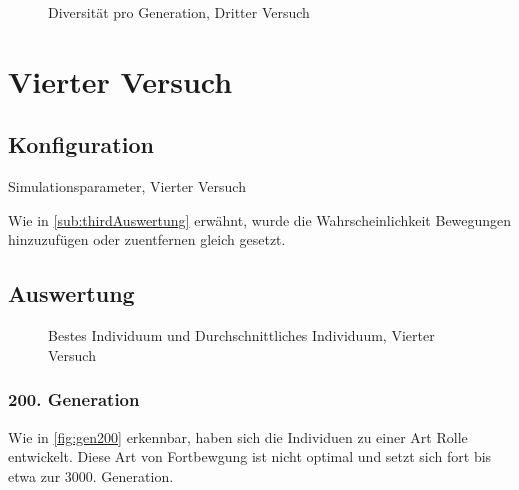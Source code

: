           \begin{figure}
            \centering
            
            \caption{Diversität pro Generation, Dritter Versuch\label{fig:graphDivThird}}
          \end{figure}

      \section{Vierter Versuch}

        \subsection{Konfiguration}

          \begin{table}[H]
            \centering
            
            \caption{Simulationsparameter, Vierter Versuch \label{tbl:forthRunConf}}
          \end{table}

          Wie in \vref{sub:thirdAuswertung} erwähnt, wurde die Wahrscheinlichkeit Bewegungen hinzuzufügen oder zuentfernen gleich gesetzt.

        \subsection{Auswertung}

          \begin{figure}[H]
            \centering
            
            \caption{Bestes Individuum und Durchschnittliches Individuum, Vierter Versuch\label{fig:graphFourth}}
          \end{figure}

          \subsubsection{200. Generation}
            Wie in \vref{fig:gen200} erkennbar, haben sich die Individuen zu einer Art Rolle entwickelt.
            Diese Art von Fortbewgung ist nicht optimal und setzt sich fort bis etwa zur 3000. Generation.

            \vspace{0.5cm}


